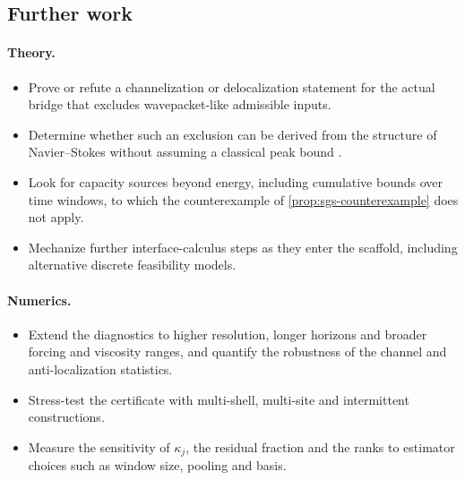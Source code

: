 \subsection{Further work}
\paragraph{Theory.}
\begin{itemize}
\item Prove or refute a channelization or delocalization statement for the actual bridge that
excludes wavepacket-like admissible inputs.
\item Determine whether such an exclusion can be derived from the structure of Navier--Stokes
without assuming a classical peak bound \citep{bkm_1984,serrin1962interior}.
\item Look for capacity sources beyond energy, including cumulative bounds over time windows, to
which the counterexample of \cref{prop:sgs-counterexample} does not apply.
\item Mechanize further interface-calculus steps as they enter the scaffold, including alternative
discrete feasibility models.
\end{itemize}
\paragraph{Numerics.}
\begin{itemize}
\item Extend the diagnostics to higher resolution, longer horizons and broader forcing and viscosity
ranges, and quantify the robustness of the channel and anti-localization statistics.
\item Stress-test the certificate with multi-shell, multi-site and intermittent constructions.
\item Measure the sensitivity of $\kappa_j$, the residual fraction and the ranks to estimator choices
such as window size, pooling and basis.
\end{itemize}

